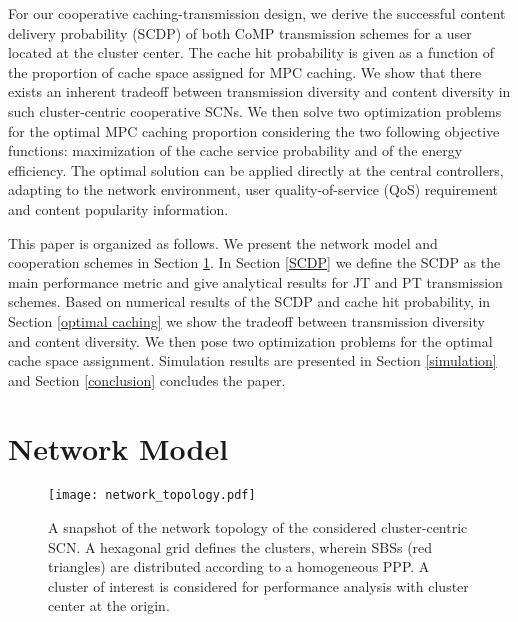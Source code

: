 \documentclass[twocolumns,10pt]{IEEEtran}
\begin{document}
For our cooperative caching-transmission design, we derive the successful content delivery probability (SCDP) of both CoMP transmission schemes for a user located at the cluster center. The cache hit probability is given as a function of the proportion of cache space assigned for MPC caching. We show that there exists an inherent tradeoff between transmission diversity and content diversity in such cluster-centric cooperative SCNs. We then solve two optimization problems for the optimal MPC caching proportion considering the two following objective functions: maximization of the cache service probability and of the energy efficiency. The optimal solution can be applied directly at the central controllers, adapting to the network environment, user quality-of-service (QoS) requirement and content popularity information. 

This paper is organized as follows. We present the network model and cooperation schemes in Section \ref{section_2}. In Section \ref{SCDP} we define the SCDP as the main performance metric and give analytical results for JT and PT transmission schemes. Based on numerical results of the SCDP and cache hit probability, in Section \ref{optimal caching} we show the tradeoff between transmission diversity and content diversity. We then pose two optimization problems for the optimal cache space assignment. Simulation results are presented in Section \ref{simulation} and Section \ref{conclusion} concludes the paper. 


\section{Network Model}
\label{section_2}

\begin{figure}
	\centering
	\texttt{[image: network\_topology.pdf]}
	\caption{ A snapshot of the network topology of the considered cluster-centric SCN. A hexagonal grid defines the clusters, wherein SBSs (red triangles) are distributed according to a homogeneous PPP. A cluster of interest is considered for performance analysis with cluster center at the origin.}
	\label{network}
\end{figure}
\end{document}
